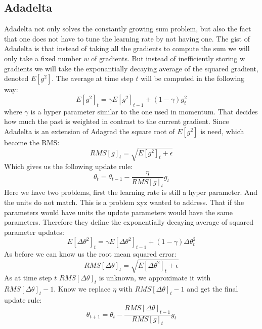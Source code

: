 {\subsection{Adadelta}\label{ssec:adadelta}
Adadelta \cite{adadelta} not only solves the constantly growing sum problem, but also the fact that one does not have to tune the learning rate by not having one. The gist of Adadelta is that instead of taking all the gradients to compute the sum we will only take a fixed number $w$ of gradients. But instead of inefficiently storing w gradients we will take the exponantially decaying average of the squared gradient, denoted $E[g^{2}]$. The average at time step $t$ will be computed in the following way: 
\begin{equation}
E[g^2]_t = \gamma E[g^2]_{t-1} + (1 - \gamma) g^2_t
\end{equation}
where $\gamma$ is a hyper parameter similar to the one used in momentum. That decides how much the past is weighted in contrast to the current gradient. Since Adadelta is an extension of Adagrad the square root of $E[g^{2}]$ is need, which become the RMS:
\begin{equation}
RMS[g]_t = \sqrt{E[g^2]_t + \epsilon}
\end{equation}
Which gives us the following update rule: 
\begin{equation}
\theta_t = \theta_{t-1} - \frac{\eta}{RMS[g]_t}g_t
\end{equation}
Here we have two problems, first the learning rate is still a hyper parameter. And the units do not match. This is a problem xyz wanted to address. That if the parameters would have units the update parameters would have the same parameters. 
Therefore they define the exponentially decaying average of squared parameter updates: 
\begin{equation}
E[\Delta \theta^2]_t = \gamma E[\Delta \theta^2]_{t-1} + (1 - \gamma) \Delta \theta^2_t
\end{equation}
As before we can know us the root mean squared error: 
\begin{equation}
RMS[\Delta \theta]_{t} = \sqrt{E[\Delta \theta^2]_t + \epsilon}
\end{equation}
As at time step $t$ $RMS[\Delta \theta]_{t} $ is unknown, we approximate it with $ RMS[\Delta \theta]_{t}-1$. Know we replace $\eta$ with  $ RMS[\Delta \theta]_{t}-1$ and get the final update rule: 
\begin{equation}
 \theta_{t+1} = \theta_t - \dfrac{RMS[\Delta \theta]_{t-1}}{RMS[g]_{t}} g_{t}
\end{equation}
}
